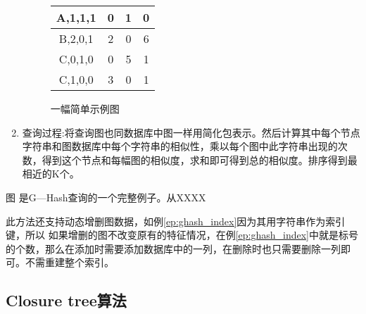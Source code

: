 \documentclass{XDBAthesis}
\begin{document}
\begin{enumerate}
\begin{exmp}
\begin{figure}[htp]
{\begin{minipage}{0.5\textwidth}
\begin{tabular}{c|c|c|c}
                    A,1,1,1 & 0 & 1 & 0 \\ \hline
                    B,2,0,1 & 2 & 0 & 6 \\ \hline
                    C,0,1,0 & 0 & 5 & 1 \\ \hline
                    C,1,0,0 & 3 & 0 & 1 \\ \hline
                \end{tabular}
            \end{minipage}
            }
            \caption{一幅简单示例图}
            \label{fg:ghash_index}
        \end{figure}     
    \end{exmp}

    \item 查询过程:将查询图也同数据库中图一样用简化包表示。然后计算其中每个节点字符串和图数据库中每个字符串的相似性，乘以每个图中此字符串出现的次数，得到这个节点和每幅图的相似度，求和即可得到总的相似度。排序得到最相近的K个。    
\end{enumerate}
图 是G—Hash查询的一个完整例子。从XXXX



此方法还支持动态增删图数据，如例\ref{ep:ghash_index}因为其用字符串作为索引键，所以
如果增删的图不改变原有的特征情况，在例\ref{ep:ghash_index}中就是标号的个数，那么在添加时需要添加数据库中的一列，在删除时也只需要删除一列即可。不需重建整个索引。
\subsection{Closure tree算法}

\ifx\allfiles\undefined


\end{document}
